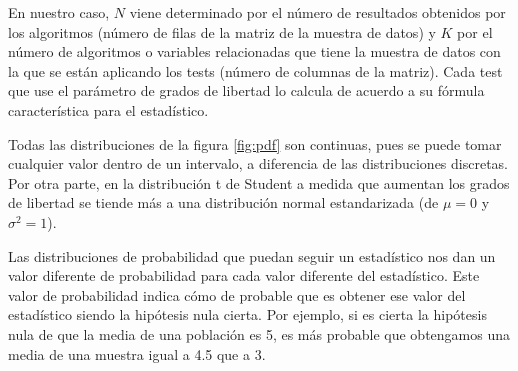 En nuestro caso, $N$ viene determinado por el número de resultados obtenidos por los algoritmos (número de filas
de la matriz de la muestra de datos) y $K$ por el número de algoritmos o variables relacionadas que tiene la muestra
de datos con la que se están aplicando los tests (número de columnas de la matriz). Cada test que use el parámetro
de grados de libertad lo calcula de acuerdo a su fórmula característica para el estadístico. 

Todas las distribuciones de la figura \ref{fig:pdf} son continuas, pues se puede tomar cualquier valor dentro de un
intervalo, a diferencia de las distribuciones discretas. Por otra parte, en la distribución t de Student a medida que
aumentan los grados de libertad se tiende más a una distribución normal estandarizada (de $\mu = 0$ y $\sigma^2 = 1$).

Las distribuciones de probabilidad que puedan seguir un estadístico nos dan un valor diferente de probabilidad para
cada valor diferente del estadístico. Este valor de probabilidad indica cómo de probable que es obtener ese valor del
estadístico siendo la hipótesis nula cierta. Por ejemplo, si es cierta la hipótesis nula de que la media de una población
es 5, es más probable que obtengamos una media de una muestra igual a 4.5 que a 3.


